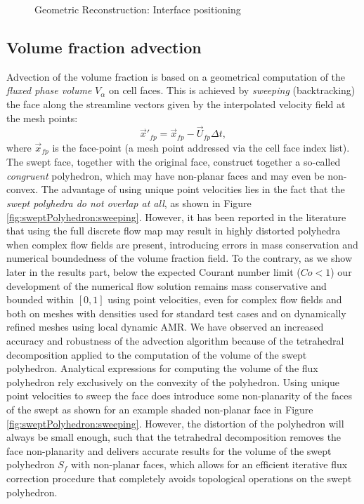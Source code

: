 \begin{figure}
    \centering
    \def\svgwidth{0.5\columnwidth}
    {\footnotesize
        
    }
    \caption{Geometric Reconstruction: Interface positioning}
    \label{fig:positioning}
\end{figure}

\subsection{Volume fraction advection}

Advection of the volume fraction is based on a geometrical computation of the
\emph{fluxed phase volume} $V_{\alpha}$ on cell faces. This is achieved by
\emph{sweeping} (backtracking) the face along the streamline vectors given by
the interpolated velocity field at the mesh points: 
%
\begin{equation} 
\vec{x}'_{fp} = \vec{x}_{fp} - \vec{U}_{fp}\Delta t,
\label{eq:sweep} 
\end{equation}
%
where $\vec{x}_{fp}$ is the face-point (a mesh point addressed via the cell
face index list).  The swept face, together with the original face, construct
together a so-called \emph{congruent} polyhedron, which may have non-planar faces and
may even be non-convex. The advantage of using unique point velocities lies in
the fact that the \emph{swept polyhedra do not overlap at all}, as shown in
Figure \ref{fig:sweptPolyhedron:sweeping}. However, it has been reported in the
literature \citep{LiovicCVTNA2006} that using the full discrete flow map may
result in highly distorted polyhedra when complex flow fields are present,
introducing errors in mass conservation and numerical boundedness of the volume
fraction field. To the contrary, as we show later in the results part, below the 
expected Courant number limit ($Co<1$) our development of the numerical flow 
solution remains mass conservative and bounded within 
$[0,1]$ using point velocities, even for complex flow fields and both on meshes 
with densities used for standard test cases and on dynamically refined meshes 
using local dynamic AMR. %
We have observed an increased accuracy and robustness of the advection algorithm 
because of the tetrahedral decomposition applied to the computation of the volume 
of the swept polyhedron. %
Analytical expressions for computing the volume of the flux polyhedron rely
exclusively on the convexity of the polyhedron. Using unique point velocities
to sweep the face does introduce some non-planarity of the faces of the swept
as shown for an example shaded non-planar face in Figure
\ref{fig:sweptPolyhedron:sweeping}. However, the distortion of the polyhedron
will always be small enough, such that the tetrahedral decomposition removes the
face non-planarity and delivers accurate results for the volume of the swept
polyhedron $S_f$ with non-planar faces, which allows for an efficient iterative
flux correction procedure that completely avoids topological operations on the
swept polyhedron. 

